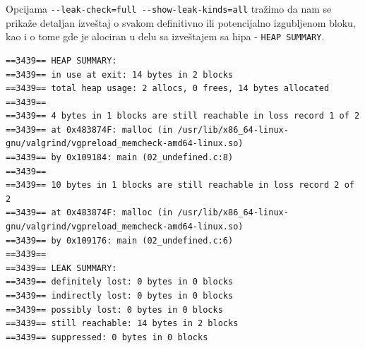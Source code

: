 Opcijama \texttt{-\/-leak-check=full\ -\/-show-leak-kinds=all} tražimo da nam se prikaže detaljan izveštaj o svakom definitivno ili potencijalno izgubljenom bloku, kao i o tome gde je alociran u delu sa izveštajem sa hipa - \texttt{HEAP\ SUMMARY}.

\begin{verbatim}
==3439== HEAP SUMMARY:
==3439== in use at exit: 14 bytes in 2 blocks
==3439== total heap usage: 2 allocs, 0 frees, 14 bytes allocated
==3439==
==3439== 4 bytes in 1 blocks are still reachable in loss record 1 of 2
==3439== at 0x483874F: malloc (in /usr/lib/x86_64-linux-gnu/valgrind/vgpreload_memcheck-amd64-linux.so)
==3439== by 0x109184: main (02_undefined.c:8)
==3439==
==3439== 10 bytes in 1 blocks are still reachable in loss record 2 of 2
==3439== at 0x483874F: malloc (in /usr/lib/x86_64-linux-gnu/valgrind/vgpreload_memcheck-amd64-linux.so)
==3439== by 0x109176: main (02_undefined.c:6)
==3439==
==3439== LEAK SUMMARY:
==3439== definitely lost: 0 bytes in 0 blocks
==3439== indirectly lost: 0 bytes in 0 blocks
==3439== possibly lost: 0 bytes in 0 blocks
==3439== still reachable: 14 bytes in 2 blocks
==3439== suppressed: 0 bytes in 0 blocks
\end{verbatim}
